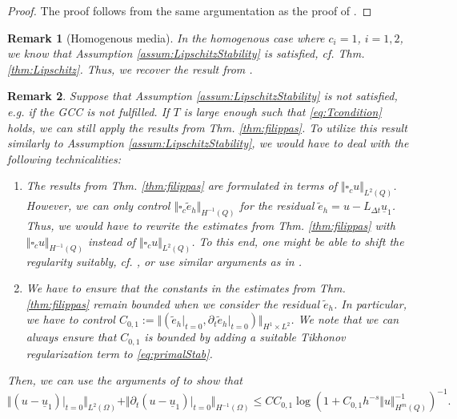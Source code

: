 \documentclass[sn-mathphys-num]{sn-jnl}
\newtheorem{rmk}{Remark}
\numberwithin{equation}{section}
\newcommand{\wop}{\square_c}
\newcommand{\ul}{\underline{u}}
\newcommand{\dt}{\partial_t}
\begin{document}
\begin{proof}
    The proof follows from the same argumentation as the proof of \cite[Theorem 10]{BP24}.
\end{proof}


\begin{rmk}[Homogenous media]\label{rem:homMedia}
    In the homogenous case where $c_i = 1$, $i = 1,2$, we know that Assumption \ref{assum:LipschitzStability} is satisfied, cf. Thm. \ref{thm:Lipschitz}. Thus, we recover the result from \cite[Thm. 4.4]{BP24}.
\end{rmk}

\begin{rmk}
    Suppose that Assumption \ref{assum:LipschitzStability} is not satisfied, e.g. if the GCC is not fulfilled. If $T$ is large enough such that \eqref{eq:Tcondition} holds, we can still apply the results from Thm. \ref{thm:filippas}. To utilize this result similarly to Assumption \ref{assum:LipschitzStability}, we would have to deal with the following technicalities:  
    \begin{enumerate}
        \item The results from Thm. \ref{thm:filippas} are formulated in terms of $\Vert \wop u \Vert_{L^2(Q)}$. However, we can only control $\Vert \wop \tilde{e}_h \Vert_{H^{-1}(Q)}$ for the residual $\tilde{e}_h = u - L_{\Delta t} \ul_1$. Thus, we would have to rewrite the estimates from Thm. \ref{thm:filippas} with $\Vert \wop u \Vert_{H^{-1}(Q)}$ instead of $\Vert \wop u \Vert_{L^2(Q)}$. To this end, one might be able to shift the regularity suitably, cf. \cite[Sec. 2.6]{StolkPhD}, or use similar arguments as in \cite[Thm. A.1]{BFMO21}.
        \item We have to ensure that the constants in the estimates from Thm. \ref{thm:filippas} remain bounded when we consider the residual $\tilde{e}_h$. In particular, we have to control $C_{0,1} := \Vert (\tilde{e}_h \vert_{t = 0}, \dt \tilde{e}_h \vert_{t = 0}) \Vert_{H^1 \times L^2}$. We note that we can always ensure that $C_{0,1}$ is bounded by adding a suitable Tikhonov regularization term to \eqref{eq:primalStab}. 
    \end{enumerate}
    Then, we can use the arguments of \cite[Theorem 10]{BP24} to show that 
    \begin{equation}
        \Vert (u - \ul_1) \vert_{t = 0} \Vert_{L^2(\Omega)}  + \Vert \dt (u - \ul_1) \vert_{t = 0} \Vert_{H^{-1}(\Omega)} \le C C_{0,1} \log(1 + C_{0,1} h^{-s} \Vert u \Vert_{H^m(Q)}^{-1})^{-1}. 
    \end{equation}
\end{rmk}
\end{document}
